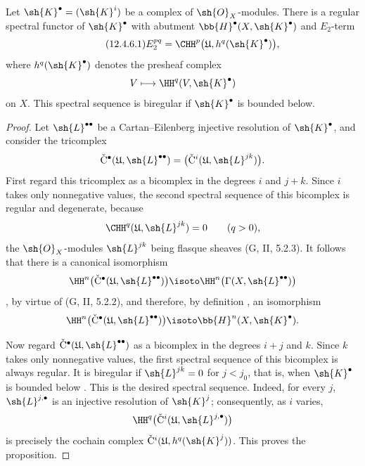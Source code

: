 \begin{proposition}[12.4.6]
\label{0.12.4.6}
Let $\sh{K}^\bullet=(\sh{K}^i)$ be a complex of
$\sh{O}_X$-modules.
There is a regular spectral functor of $\sh{K}^\bullet$ with
abutment $\bb{H}^\bullet(X,\sh{K}^\bullet)$ and $E_2$-term
\begin{equation}
\label{0.12.4.6.1}
\tag{12.4.6.1}
  E_2^{pq}
  =
  \CHH^p\bigl(\mathfrak{U},h^q(\sh{K}^\bullet)\bigr),
\end{equation}
where $h^q(\sh{K}^\bullet)$ denotes the presheaf complex
\[
  V\longmapsto\HH^q(V,\sh{K}^\bullet)
\]
on $X$.
This spectral sequence is biregular if $\sh{K}^\bullet$ is bounded
below.
\end{proposition}

\begin{proof}
Let $\sh{L}^{\bullet\bullet}$ be a Cartan--Eilenberg injective
resolution of $\sh{K}^\bullet$, and consider the tricomplex
\[
  \check{\mathrm{C}}^\bullet
  (\mathfrak{U},\sh{L}^{\bullet\bullet})
  =
  \bigl(\check{\mathrm{C}}^i
    (\mathfrak{U},\sh{L}^{jk})\bigr).
\]
First regard this tricomplex as a bicomplex in the degrees $i$ and
$j+k$.
Since $i$ takes only nonnegative values, the second spectral sequence
of this bicomplex is regular  and degenerate, because
\[
  \CHH^q(\mathfrak{U},\sh{L}^{jk})=0
  \qquad(q>0),
\]
the $\sh{O}_X$-modules $\sh{L}^{jk}$ being flasque sheaves
(G, II, 5.2.3).
It follows that there is a canonical isomorphism
\[
  \HH^n\bigl(
    \check{\mathrm{C}}^\bullet
      (\mathfrak{U},\sh{L}^{\bullet\bullet})
  \bigr)
  \isoto
  \HH^n\bigl(\Gamma(X,\sh{L}^{\bullet\bullet})\bigr)
\]
, by virtue of (G, II, 5.2.2), and therefore, by
definition , an isomorphism
\[
  \HH^n\bigl(
    \check{\mathrm{C}}^\bullet
      (\mathfrak{U},\sh{L}^{\bullet\bullet})
  \bigr)
  \isoto
  \bb{H}^n(X,\sh{K}^\bullet).
\]

Now regard
$\check{\mathrm{C}}^\bullet
(\mathfrak{U},\sh{L}^{\bullet\bullet})$
as a bicomplex in the degrees $i+j$ and $k$.
Since $k$ takes only nonnegative values, the first spectral sequence
of this bicomplex is always regular.
It is biregular if $\sh{L}^{jk}=0$ for $j<j_0$, that is, when
$\sh{K}^\bullet$ is bounded below .
This is the desired spectral sequence.
Indeed, for every $j$, $\sh{L}^{j,\bullet}$ is an injective
resolution of $\sh{K}^j$; consequently, as $i$ varies,
\[
  \HH^q\bigl(
    \check{\mathrm{C}}^i
      (\mathfrak{U},\sh{L}^{j,\bullet})
  \bigr)
\]
is precisely the cochain complex
$\check{\mathrm{C}}^i(\mathfrak{U},h^q(\sh{K}^j))$.
This proves the proposition.
\end{proof}

